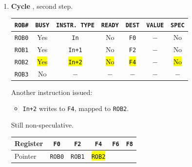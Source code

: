 \begin{examplebox}
\begin{enumerate}
        \item \textbf{Cycle \theenumi}, second step.
        \begin{center}
            \begin{tabular}{@{} c | c | c | c | c | c | c @{}}
                \toprule
                \texttt{ROB\#} & \texttt{BUSY} & \texttt{INSTR. TYPE} & \texttt{READY} & \texttt{DEST} & \texttt{VALUE} & \texttt{SPEC} \\
                \midrule
                \texttt{ROB0} & Yes         & \texttt{In}           & No        & \texttt{F0}       & $-$     & No          \\ [.3em]
                \texttt{ROB1} & Yes         & \texttt{In+1}         & No        & \texttt{F2}       & $-$     & No          \\ [.3em]
                \texttt{ROB2} & \hl{Yes}    & \hl{\texttt{In+2}}    & \hl{No}   & \hl{\texttt{F4}}  & $-$     & \hl{No}     \\ [.3em]
                \texttt{ROB3} & No          & $-$                   & $-$       & $-$               & $-$     & $-$         \\
                \bottomrule
            \end{tabular}
        \end{center}
        Another instruction issued:
        \begin{itemize}
            \item \texttt{In+2} writes to \texttt{F4}, mapped to \texttt{ROB2}.
        \end{itemize}
        Still non-speculative.
        \begin{center}
            \begin{tabular}{@{} l | c c c c c @{}}
                \toprule
                Register    & \texttt{F0}   & \texttt{F2}   & \texttt{F4}           & \texttt{F6}   & \texttt{F8} \\
                \midrule
                Pointer     & \texttt{ROB0} & \texttt{ROB1} & \hl{\texttt{ROB2}}    &               &             \\
                \bottomrule
            \end{tabular}
        \end{center}


        \newpage



\end{enumerate}
\end{examplebox}
